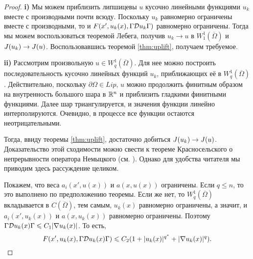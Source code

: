\begin{proof}
\textbf{\textup{i)}} Мы можем приблизить липшицевы $u$ кусочно линейными функциями $u_k$ вместе с производными почти всюду.
Поскольку $u_k$ равномерно ограничены вместе с производными,
то и $F(x', u_k(x), \norm{\mathcal{D} u_k})$ равномерно ограничены.
Тогда мы можем воспользоваться теоремой Лебега, получив $u_k \to u$ в $W^1_1(\overline{\Omega})$ и $J( u_k ) \to J( u )$.
Воспользовавшись теоремой \ref{thm:uplift}, получаем требуемое.

\textbf{\textup{ii)}} Рассмотрим произвольную $u \in W^1_q(\overline{\Omega})$.
Для нее можно построить последовательность кусочно линейных функций $u_k$, приближающих её в $W^1_q(\overline{\Omega})$.
Действительно, поскольку $\partial \Omega \in Lip$,
$u$ можно продолжить финитным образом на внутренность большого шара в $\mathbb R^n$
и приблизить гладкими финитными функциями.
Далее шар триангулируется, и значения функции линейно интерполируются.
Очевидно, в процессе все функции остаются неотрицательными.

Тогда, ввиду теоремы \ref{thm:uplift}, достаточно добиться $J( u_k ) \to J( u )$.
Доказательство этой сходимости можно свести к теореме Красносельского о непрерывности
оператора Немыцкого (см. \cite[гл. 5, ]{Krasnoselsky}).
Однако для удобства читателя мы приводим здесь рассуждение целиком.

Покажем, что веса $a_i(x', u(x))$ и $a(x, u(x))$ ограничены.
Если $q \le n$, то это выполнено по предположению теоремы. Если же нет, то $W^1_q(\overline{\Omega})$ вкладывается в $C(\overline{\Omega})$,
тем самым, $u_k(x)$ равномерно ограничены, а значит, и $a_i(x', u_k(x))$ и $a(x, u_k(x))$ равномерно ограничены.
Поэтому $\norm{ \mathcal{D} u_k( x ) } \le C_1 |\nabla u_k( x )|$.
То есть,
$$F( x', u_k( x ), \norm{ \mathcal{D} u_k( x ) } ) \le C_2 ( 1 + |u_k( x )|^{q^*} + |\nabla u_k( x )|^q ).$$



\end{proof}
